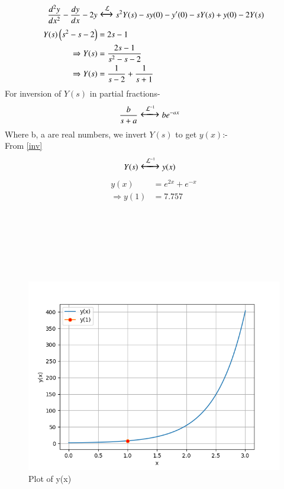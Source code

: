 \documentclass[journal,12pt,twocolumn]{IEEEtran}
\theoremstyle{remark}
\begin{document}
\begin{align}
    \frac{d^2y}{dx^2}-\frac{dy}{dx}-2y&\Large\xleftrightarrow{\mathcal{L}}s^2Y(s)-sy(0)-y'(0)-sY(s)+y(0)-2Y(s)\\
	Y(s)\left(s^2-s-2\right)&=2s-1\\
    \Rightarrow Y(s)&=\frac{2s-1}{s^2-s-2}\\
    \Rightarrow Y(s)&=\frac{1}{s-2}+\frac{1}{s+1}
\end{align}
For inversion of $Y(s)$ in partial fractions-
\begin{align}
    &\frac{b}{s+a}\Large\xleftrightarrow{\mathcal{L}^{-1}}be^{-ax}\label{inv}
\end{align}
Where b, a are real numbers, we invert $Y(s)$ to get $y(x)$:-\\
From \eqref{inv}
\begin{align}
    &Y(s)\Large\xleftrightarrow{\mathcal{L}^{-1}} y(x)
\end{align}
\begin{align}
	y(x)&=e^{2x}+e^{-x}\\
   \Rightarrow y(1)&=7.757
\end{align}\\
\\
\\
\\
\\
\\
\begin{figure}
    \centering
    \includegraphics[width=1\linewidth]{figures/gate.png}
	\caption{Plot of y(x)}
    \label{fig:enter-label}
\end{figure}
\end{document}
